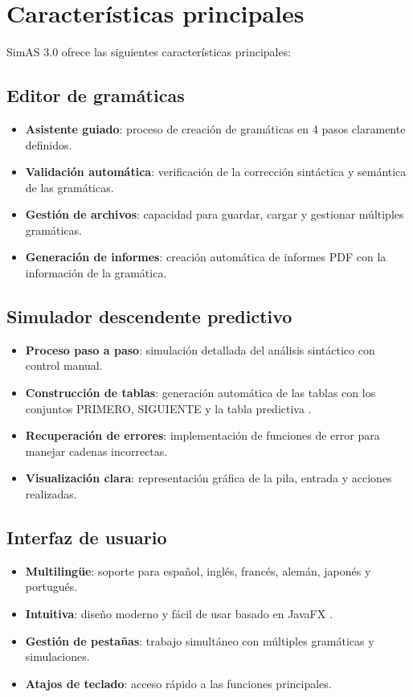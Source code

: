 \section{Características principales}

SimAS 3.0 ofrece las siguientes características principales:

\subsection{Editor de gramáticas}
\begin{itemize}
    \item \textbf{Asistente guiado}: proceso de creación de gramáticas en 4 pasos claramente definidos.
    \item \textbf{Validación automática}: verificación de la corrección sintáctica y semántica de las gramáticas.
    \item \textbf{Gestión de archivos}: capacidad para guardar, cargar y gestionar múltiples gramáticas.
    \item \textbf{Generación de informes}: creación automática de informes PDF con la información de la gramática.
\end{itemize}

\subsection{Simulador descendente predictivo}
\begin{itemize}
    \item \textbf{Proceso paso a paso}: simulación detallada del análisis sintáctico con control manual.
    \item \textbf{Construcción de tablas}: generación automática de las tablas con los conjuntos PRIMERO, SIGUIENTE y la tabla predictiva \cite{first-follow}.
    \item \textbf{Recuperación de errores}: implementación de funciones de error para manejar cadenas incorrectas.
    \item \textbf{Visualización clara}: representación gráfica de la pila, entrada y acciones realizadas.
\end{itemize}

\subsection{Interfaz de usuario}
\begin{itemize}
    \item \textbf{Multilingüe}: soporte para español, inglés, francés, alemán, japonés y portugués.
    \item \textbf{Intuitiva}: diseño moderno y fácil de usar basado en JavaFX \cite{javafx}.
    \item \textbf{Gestión de pestañas}: trabajo simultáneo con múltiples gramáticas y simulaciones.
    \item \textbf{Atajos de teclado}: acceso rápido a las funciones principales.
\end{itemize}

